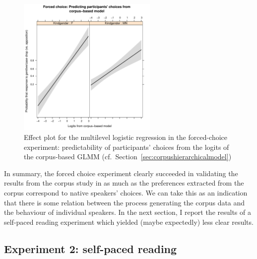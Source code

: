 \documentclass[USenglish]{article}
\begin{document}
\begin{figure}[h]
\centering
\includegraphics[width=0.6\textwidth]{figures/experiment/2afc_effects}
\caption{Effect plot for the multilevel logistic regression in the forced-choice experiment: predictability of participants' choices from the logits of the corpus-based GLMM (cf.\ Section~\ref{sec:corpushierarchicalmodel})}
\label{fig:afc:effects}
\end{figure}

In summary, the forced choice experiment clearly succeeded in validating the results from the corpus study in as much as the preferences extracted from the corpus correspond to native speakers' choices.
We can take this as an indication that there is some relation between the process generating the corpus data and the behaviour of individual speakers.
In the next section, I report the results of a self-paced reading experiment which yielded (maybe expectedly) less clear results.




\subsection{Experiment 2: self-paced reading}

\end{document}
